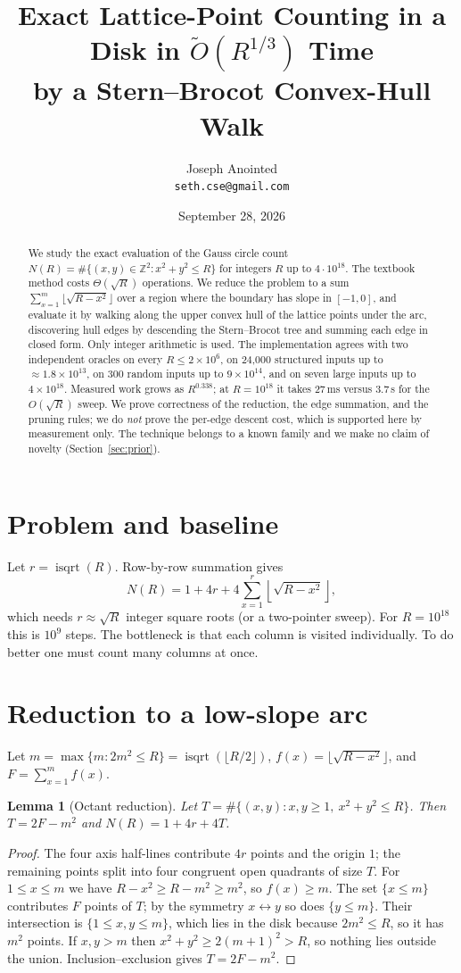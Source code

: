 \documentclass[11pt]{article}
\title{Exact Lattice-Point Counting in a Disk in $\tilde O(R^{1/3})$ Time\\
by a Stern--Brocot Convex-Hull Walk}
\author{Joseph Anointed\\
\texttt{seth.cse@gmail.com}}
\date{September 28, 2026}
\newtheorem{lemma}{Lemma}
\theoremstyle{remark}
\newcommand{\Z}{\mathbb{Z}}
\newcommand{\isqrt}{\operatorname{isqrt}}
\begin{document}
\maketitle

\begin{abstract}
We study the exact evaluation of the Gauss circle count
$N(R)=\#\{(x,y)\in\Z^2: x^2+y^2\le R\}$ for integers $R$ up to $4\cdot 10^{18}$.
The textbook method costs $\Theta(\sqrt R)$ operations. We reduce the problem to a sum
$\sum_{x=1}^{m}\lfloor\sqrt{R-x^2}\rfloor$ over a region where the boundary has slope in $[-1,0]$,
and evaluate it by walking along the upper convex hull of the lattice points under the arc,
discovering hull edges by descending the Stern--Brocot tree and summing each edge in closed form.
Only integer arithmetic is used. The implementation agrees with two independent oracles on
every $R\le 2\times 10^{6}$, on 24{,}000 structured inputs up to $\approx 1.8\times10^{13}$, on 300 random inputs
up to $9\times 10^{14}$, and on seven large inputs up to $4\times 10^{18}$.
Measured work grows as $R^{0.338}$; at $R=10^{18}$ it takes 27\,ms versus 3.7\,s for the $O(\sqrt R)$ sweep.
We prove correctness of the reduction, the edge summation, and the pruning rules; we do \emph{not} prove
the per-edge descent cost, which is supported here by measurement only.
The technique belongs to a known family and we make no claim of novelty (Section~\ref{sec:prior}).
\end{abstract}

\section{Problem and baseline}
Let $r=\isqrt(R)$. Row-by-row summation gives
\[
N(R)=1+4r+4\sum_{x=1}^{r}\left\lfloor\sqrt{R-x^2}\right\rfloor ,
\]
which needs $r\approx\sqrt R$ integer square roots (or a two-pointer sweep). For $R=10^{18}$ this is $10^9$ steps.
The bottleneck is that each column is visited individually. To do better one must count many columns at once.

\section{Reduction to a low-slope arc}
Let $m=\max\{m: 2m^2\le R\}=\isqrt(\lfloor R/2\rfloor)$, $f(x)=\lfloor\sqrt{R-x^2}\rfloor$, and
$F=\sum_{x=1}^{m}f(x)$.

\begin{lemma}[Octant reduction]\label{lem:oct}
Let $T=\#\{(x,y): x,y\ge1,\ x^2+y^2\le R\}$. Then $T=2F-m^2$ and $N(R)=1+4r+4T$.
\end{lemma}
\begin{proof}
The four axis half-lines contribute $4r$ points and the origin $1$; the remaining points split into four congruent open quadrants of size $T$.
For $1\le x\le m$ we have $R-x^2\ge R-m^2\ge m^2$, so $f(x)\ge m$. The set $\{x\le m\}$ contributes $F$ points of $T$; by the symmetry $x\leftrightarrow y$ so does $\{y\le m\}$.
Their intersection is $\{1\le x,y\le m\}$, which lies in the disk because $2m^2\le R$, so it has $m^2$ points.
If $x,y>m$ then $x^2+y^2\ge 2(m+1)^2>R$, so nothing lies outside the union. Inclusion--exclusion gives $T=2F-m^2$.
\end{proof}
\end{document}
